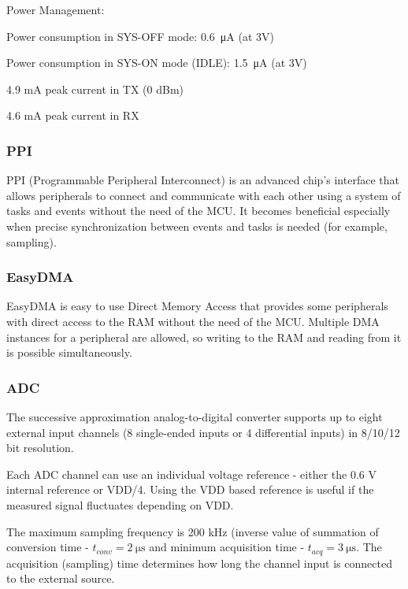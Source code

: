             \begin{titleitemize}{Power Management:}
                \item Power consumption in SYS-OFF mode:  \SI{0.6}{\micro\ampere} (at 3V)
                \item Power consumption in SYS-ON mode (IDLE):   \SI{1.5}{\micro\ampere} (at 3V)
                \item 4.9 mA peak current in TX (0 dBm)
                \item 4.6 mA peak current in RX
            \end{titleitemize}
        
        
        \subsubsection{PPI}
        \label{sec:ppi}
             PPI (Programmable Peripheral Interconnect) is an advanced chip's interface that allows peripherals to connect and communicate with each other using a system of tasks and events without the need of the MCU. It becomes beneficial especially when precise synchronization between events and tasks is needed (for example, sampling).
        
        \subsubsection{EasyDMA}
            EasyDMA is easy to use Direct Memory Access that provides some peripherals with direct access to the RAM without the need of the MCU. Multiple DMA instances for a peripheral are allowed, so writing to the RAM and reading from it is possible simultaneously.
        
        
        \subsubsection{ADC}
            The successive approximation analog-to-digital converter supports up to eight external input channels (8 single-ended inputs or 4 differential inputs) in 8/10/12 bit resolution.
            
            Each ADC channel can use an individual voltage reference - either the 0.6 V internal reference or VDD/4. Using the VDD based reference is useful if the measured signal fluctuates depending on VDD.
            
            The maximum sampling frequency is 200 kHz (inverse value of summation of conversion time - $t_{conv} = \SI{2}{\micro\second}$ and minimum acquisition time - $t_{acq} = \SI{3}{\micro\second}$. The acquisition (sampling) time determines how long the channel input is connected to the external source. 
            
